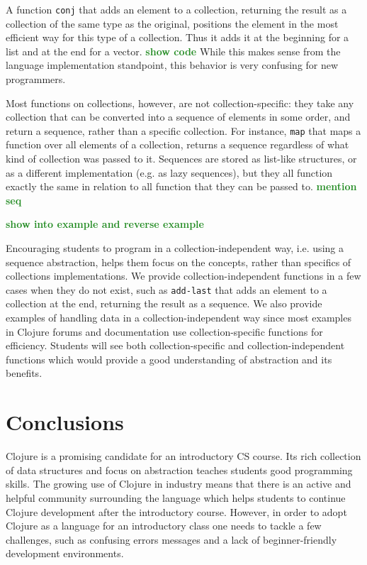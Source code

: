 \documentclass[submission,copyright,creativecommons]{eptcs}
\newcommand{\allcomments}[1]{{#1}}
\newcommand{\elenacomment}[1]{{\bf \textcolor{ForestGreen}{\allcomments{{#1}}}}}
\newcommand{\todo}[1]{{\bf \color{magenta}{\allcomments{ To-do: {#1}}}}}
\begin{document}
A function {\tt conj} that adds an element to a collection, returning the result as a collection of the same type as the original, positions the element in the most efficient way for this type of a collection. Thus it adds it at the beginning for a list and at the end for a vector. 
\elenacomment{show code}
While this makes sense from the language implementation standpoint, this behavior is very confusing for new programmers. 

Most functions on collections, however, are not collection-specific: they take any collection that can be converted into a sequence of elements in some order, and return a sequence, rather than a specific collection. For instance, {\tt map} that maps a function
over all elements of a collection, returns a sequence regardless of what kind of collection was passed to it. Sequences are stored as list-like structures, or as a different implementation (e.g. as lazy sequences), but they all function exactly the same in relation to all function that they can be passed to. 
\elenacomment{mention seq}

\elenacomment{show into example and reverse example}

Encouraging students to program in a collection-independent way, i.e. using a sequence abstraction, helps them focus on the concepts, rather than specifics of collections implementations. We provide collection-independent functions in a few cases when they do not exist, such as {\tt add-last} that adds an element to a collection at the end, returning the result as a sequence. We also provide examples of handling data in a collection-independent way since most  examples in Clojure forums and documentation use collection-specific functions for efficiency. Students will see both collection-specific and collection-independent functions which would provide a good understanding of abstraction and its benefits. 



\section{Conclusions}
Clojure is a promising candidate for an introductory CS course. Its rich collection of data structures and focus on abstraction teaches students good programming skills. The growing use of Clojure in industry means that there is an active and helpful community surrounding the language which helps students to continue Clojure development after the introductory course. However, in order to adopt Clojure as a language for an introductory class one needs to tackle a few challenges, such as confusing errors messages and  a lack of beginner-friendly development environments.
\end{document}
